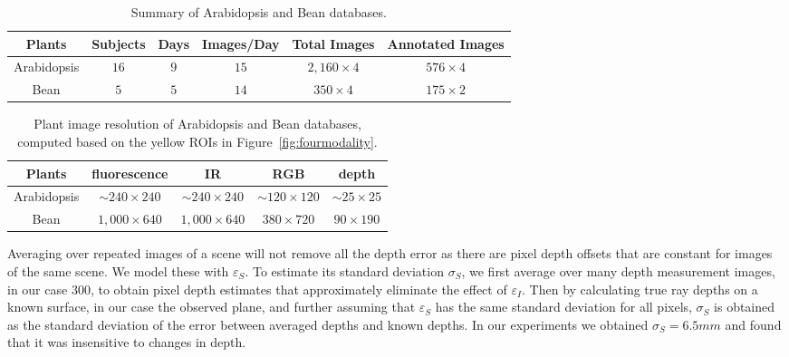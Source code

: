 \begin{table*}[t!]
\begin{center}
\caption{Summary of Arabidopsis and Bean databases.}
\label{tab:stat}
\begin{tabular}{c|c|c|c|c|c}
\hline
Plants & Subjects & Days & Images/Day & Total Images & Annotated Images \\
\hline
Arabidopsis & $16$ & $9$ & $15$ & $2,160\times 4$ & $576\times 4$ \\
\hline
Bean & $5$ & $5$ & $14$ & $350\times 4$ & $175\times 2$ \\
\hline
\end{tabular}
\end{center}
\end{table*}



\begin{table*}
\begin{center}
\caption{Plant image resolution of Arabidopsis and Bean databases, computed based on the yellow ROIs in Figure~\ref{fig:fourmodality}.}
\label{tab:resolution}
\begin{tabular}{c|c|c|c|c}
\hline
Plants & fluorescence & IR & RGB & depth \\
\hline
Arabidopsis & $\sim$$240\times240$ & $\sim$$240\times240$ & $\sim$$120\times120$ & $\sim$$25\times25$ \\
Bean & $1,000\times640$ & $1,000\times640$ & $380\times720$ & $90\times190$ \\
\hline
\end{tabular}
\end{center}
\end{table*}

Averaging over repeated images of a scene will not remove all the depth error as there are pixel depth offsets that are constant for images of the same scene.
We model these with $\varepsilon_S$.
To estimate its standard deviation $\sigma_S$, we first average over many depth measurement images, in our case $300$, to obtain pixel depth estimates that approximately eliminate the effect of $\varepsilon_I$. Then by calculating true ray depths on a known surface, in our case the observed plane, and further assuming that $\varepsilon_S$ has the same standard deviation for all pixels, $\sigma_S$ is obtained as the standard deviation of the error between averaged depths and known depths. In our experiments we obtained $\sigma_S=6.5mm$ and found that it was insensitive to changes in depth.

